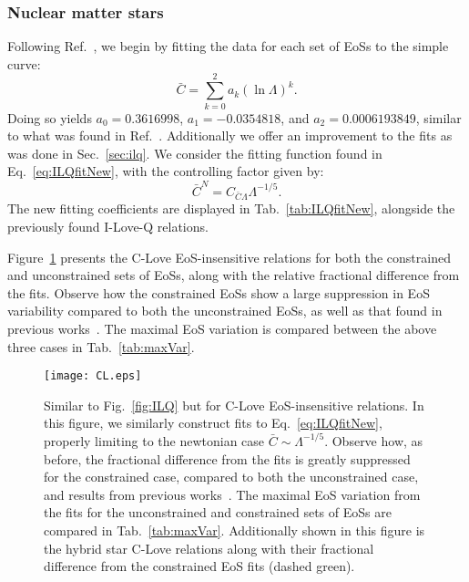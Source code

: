 \documentclass[prd,twocolumn,nofootinbib,superscriptaddress,amsmath,amssymb]{revtex4-1}
\begin{document}
\subsubsection{Nuclear matter stars}\label{sec:clove-nuc}
Following Ref.~\cite{Yagi:binLove}, we begin by fitting the data for each set of EoSs to the simple curve:
\begin{equation}
\bar{C} = \sum^2_{k=0} a_k (\ln{\Lambda})^k.
\end{equation}
Doing so yields $a_0 = 0.3616998$, $a_1 = -0.0354818$, and $a_2 = 0.0006193849$, similar to what was found in Ref.~\cite{Yagi:binLove}.
Additionally we offer an improvement to the fits as was done in Sec.~\ref{sec:ilq}. 
We consider the fitting function found in Eq.~\ref{eq:ILQfitNew}, with the controlling factor given by:
\begin{equation}
\bar{C}^N=C_{\bar{C}\Lambda}\Lambda^{-1/5}.\label{eq:cloveFit}
\end{equation}
The new fitting coefficients are displayed in Tab.~\ref{tab:ILQfitNew}, alongside the previously found I-Love-Q relations.

Figure~\ref{fig:clove} presents the C-Love EoS-insensitive relations for both the constrained and unconstrained sets of EoSs, along with the relative fractional difference from the fits. 
Observe how the constrained EoSs show a large suppression in EoS variability compared to both the unconstrained EoSs, as well as that found in previous works~\cite{Yagi:binLove}.
The maximal EoS variation is compared between the above three cases in Tab.~\ref{tab:maxVar}.
\begin{figure}
\begin{center} 
\texttt{[image: CL.eps]}
\end{center}
\caption{
Similar to Fig.~\ref{fig:ILQ} but for C-Love EoS-insensitive relations.
In this figure, we similarly construct fits to  Eq.~\ref{eq:ILQfitNew}, properly limiting to the newtonian case $\bar{C} \sim \Lambda^{-1/5}$.
Observe how, as before, the fractional difference from the fits is greatly suppressed for the constrained case, compared to both the unconstrained case, and results from previous works~\cite{Yagi:binLove}.
The maximal EoS variation from the fits for the unconstrained and constrained sets of EoSs are compared in Tab.~\ref{tab:maxVar}.
Additionally shown in this figure is the hybrid star C-Love relations along with their fractional difference from the constrained EoS fits (dashed green).
}
\label{fig:clove}
\end{figure} 
\end{document}
